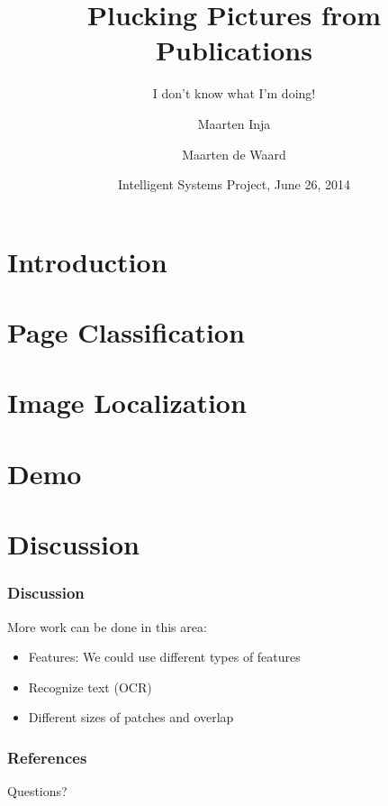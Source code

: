 \documentclass{beamer}
\title{Plucking Pictures from Publications}
\subtitle{I don't know what I'm doing!}
\author{Maarten Inja \and Maarten de Waard}
\institute[UvA]{University of Amsterdam}
\date[2014]{Intelligent Systems Project, June 26, 2014}
\newcommand{\slide}[2]
{
\begin{frame}
\frametitle{#1} 

#2

\end{frame}
}
\begin{document}
\begin{frame}
\titlepage
\end{frame}

\section{Introduction}


\section{Page Classification}


\section{Image Localization}




\section{Demo}


\section{Discussion}

\slide{Discussion}
{
	More work can be done in this area:
	\begin{itemize}
		\item Features: We could use different types of features 
		\item Recognize text (OCR)
		\item Different sizes of patches and overlap
	\end{itemize}
}
\begin{frame}[allowframebreaks]
        \frametitle{References}
        
        
\end{frame}

\begin{frame}
Questions?
\end{frame}
\end{document}
